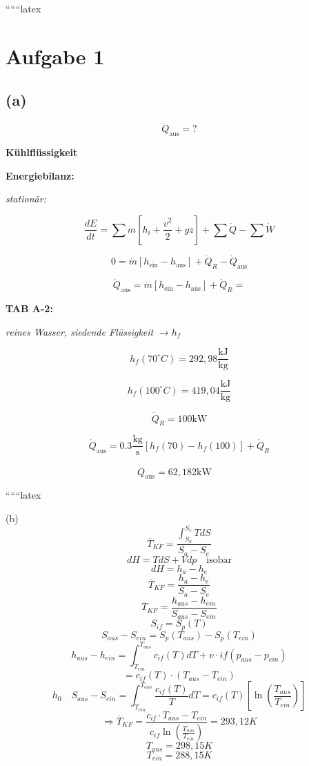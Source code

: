 
``````latex


\section*{Aufgabe 1}

\subsection*{(a)}

\[
\dot{Q}_{\text{aus}} = ?
\]

\textbf{Kühlflüssigkeit}

\textbf{Energiebilanz:}

\textit{stationär:}

\[
\frac{dE}{dt} = \sum \dot{m} \left[ h_i + \frac{v^2}{2} + gz \right] + \sum \dot{Q} - \sum \dot{W}
\]

\[
0 = \dot{m} \left[ h_{\text{ein}} - h_{\text{aus}} \right] + \dot{Q}_R - \dot{Q}_{\text{aus}}
\]

\[
\dot{Q}_{\text{aus}} = \dot{m} \left[ h_{\text{ein}} - h_{\text{aus}} \right] + \dot{Q}_R =
\]

\textbf{TAB A-2:}

\textit{reines Wasser, siedende Flüssigkeit} $\rightarrow h_f$

\[
h_f (70^\circ C) = 292,98 \frac{\text{kJ}}{\text{kg}}
\]

\[
h_f (100^\circ C) = 419,04 \frac{\text{kJ}}{\text{kg}}
\]

\[
\dot{Q}_R = 100 \text{kW}
\]

\[
\dot{Q}_{\text{aus}} = 0.3 \frac{\text{kg}}{\text{s}} \left[ h_f (70) - h_f (100) \right] + \dot{Q}_R
\]

\[
\dot{Q}_{\text{aus}} = 62,182 \text{kW} \quad \boxed{}
\]

``````latex


(b)
\[
\overline{T}_{KF} = \frac{\int_{S_a}^{S_e} T dS}{S_a - S_e}
\]
\[
dH = T dS + V dp \quad \text{isobar}
\]
\[
dH = h_a - h_e
\]
\[
\overline{T}_{KF} = \frac{h_a - h_e}{S_a - S_e}
\]
\[
\overline{T}_{KF} = \frac{h_{aus} - h_{ein}}{S_{aus} - S_{ein}}
\]
\[
S_{if} = S_p(T)
\]
\[
S_{aus} - S_{ein} = S_p(T_{aus}) - S_p(T_{ein})
\]
\[
h_{aus} - h_{ein} = \int_{T_{ein}}^{T_{aus}} c_{if}(T) dT + v \cdot if(p_{aus} - p_{ein})
\]
\[
= c_{if}(T) \cdot (T_{aus} - T_{ein})
\]
\[
h_0 \quad S_{aus} - S_{ein} = \int_{T_{ein}}^{T_{aus}} \frac{c_{if}(T)}{T} dT = c_{if}(T) \left[ \ln \left( \frac{T_{aus}}{T_{ein}} \right) \right]
\]
\[
\Rightarrow \overline{T}_{KF} = \frac{c_{if} \cdot T_{aus} - T_{ein}}{c_{if} \ln \left( \frac{T_{aus}}{T_{ein}} \right)} = 293,12 K
\]
\[
T_{aus} = 298,15 K
\]
\[
T_{ein} = 288,15 K
\]

